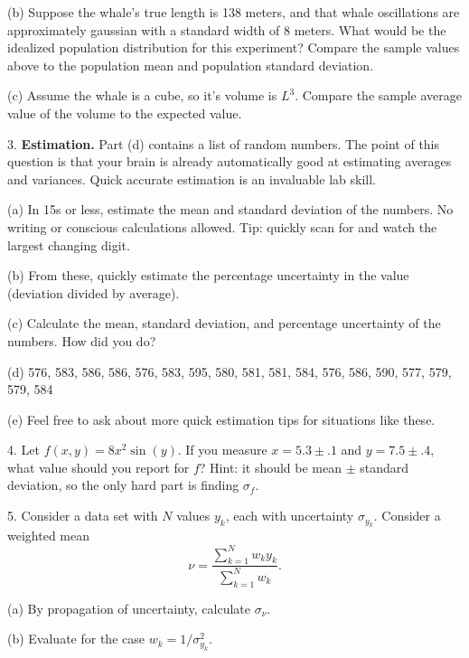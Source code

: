 \documentclass[12pt]{article}
\newcommand{\qspace}{\vskip15pt}
\begin{document}
(b) Suppose the whale's true length is 138 meters, and that whale oscillations are approximately gaussian with a standard width of 8 meters. What would be the idealized population distribution for this experiment? Compare the sample values above to the population mean and population standard deviation.

(c) Assume the whale is a cube, so it's volume is $L^3$. Compare the sample average value of the volume to the expected value.

\qspace



3. \textbf{Estimation.} Part (d) contains a list of random numbers. The point of this question is that your brain is already automatically good at estimating averages and variances. Quick accurate estimation is an invaluable lab skill.

(a) In 15s or less, estimate the mean and standard deviation of the numbers. No writing or conscious calculations allowed. Tip: quickly scan for and watch the largest changing digit.

(b) From these, quickly estimate the percentage uncertainty in the value (deviation divided by average).

(c) Calculate the mean, standard deviation, and percentage uncertainty of the numbers. How did you do?

(d) 576, 583, 586, 586, 576, 583, 595, 580, 581, 581, 584, 576, 586, 590, 577, 579, 579, 584

(e) Feel free to ask about more quick estimation tips for situations like these.



\clearpage


4. Let $f(x,y) = 8x^2 \sin(y)$. If you measure $x=5.3 \pm .1$ and $y=7.5 \pm .4$, what value should you report for $f$? Hint: it should be mean $\pm$ standard deviation, so the only hard part is finding $\sigma_f$.

\qspace

\qspace


5. Consider a data set with $N$ values $y_k$, each with uncertainty $\sigma_{y_k}$. Consider a weighted mean
\begin{equation*}
	\nu = \frac{\sum_{k=1}^{N} w_k y_k}{\sum_{k=1}^{N} w_k}.
\end{equation*}

(a) By propagation of uncertainty, calculate $\sigma_\nu$.

(b) Evaluate for the case $w_k = 1/\sigma_{y_k}^2$.
\end{document}
